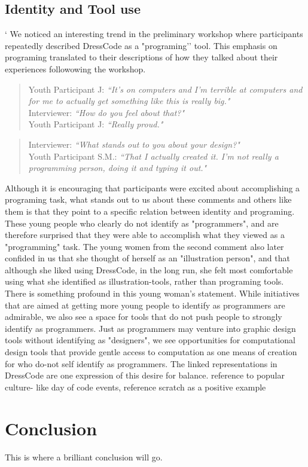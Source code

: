 \documentclass{sigchi}
\begin{document}
\subsection{Identity and Tool use}
` We noticed an interesting trend in the preliminary workshop where participants repeatedly described DressCode as a "programing'' tool. This emphasis on programing translated to their descriptions of how they talked about their experiences followowing the workshop.
 \begin{quotation}
Youth Participant J: \textit{``It's on computers and I'm terrible at computers and for me to actually get something like this is really big."} 
\\Interviewer:  \textit{``How do you feel about that?"}
\\Youth Participant J:  \textit{``Really proud."} 
\end{quotation}

 \begin{quotation}
 Interviewer:  \textit{``What stands out to you about your design?"}
 \\Youth Participant S.M.: \textit{``That I actually created it. I'm not really a programming person, doing it and typing it out."}
 \end{quotation}

Although it is encouraging that participants were excited about accomplishing a programing task, what stands out to us about these comments and others like them is that they point to a specific relation between identity and programing. These young people who clearly do not identify as "programmers", and are therefore surprised that they were able to accomplish what they viewed as a "programming" task. The young women from the second comment also later confided in us that she thought of herself as an "illustration person", and that although she liked using DressCode, in the long run, she felt most comfortable using what she identified as illustration-tools, rather than programing tools. 
There is something profound in this young woman's statement. While initiatives that are aimed at getting more young people to identify as programmers are admirable, we also see a space for tools that do not push people to strongly identify as programmers. Just as programmers may venture into graphic design tools without identifying as "designers", we see opportunities for computational design tools that provide gentle access to computation as one means of creation for who do-not self identify as programmers. The linked representations in DressCode are one expression of this desire for balance.
reference to popular culture- like day of code events, reference scratch as a positive example

\section{Conclusion}
This is where a brilliant conclusion will go.



\end{document}
